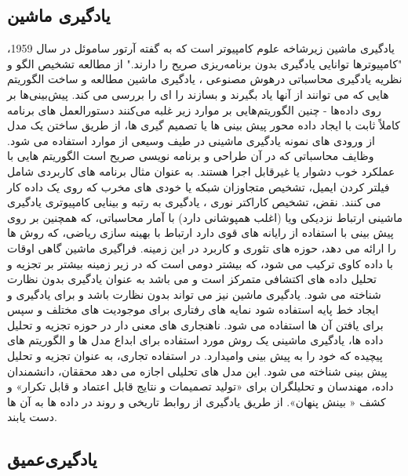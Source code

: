 \subsection{یادگیری‌ ماشین}
یادگیری ماشین زیرشاخه علوم کامپیوتر است که
به گفته آرتور ساموئل در سال 1959، "کامپیوترها
توانایی یادگیری بدون برنامه‌ریزی صریح را دارند."
از مطالعه تشخیص الگو و
نظریه یادگیری محاسباتی درهوش مصنوعی
، یادگیری ماشین مطالعه‌ و
ساخت الگوریتم هایی که می توانند از آنها یاد بگیرند و بسازند را ای را بررسی می کند. 
پیش‌بینی‌ها بر روی داده‌ها  - چنین الگوریتم‌هایی بر موارد زیر غلبه می‌کنند
دستورالعمل های برنامه کاملاً ثابت با ایجاد داده محور
پیش بینی ها یا تصمیم گیری ها، از طریق ساختن یک مدل از
ورودی های نمونه یادگیری ماشینی در طیف وسیعی از موارد استفاده می شود. 
وظایف محاسباتی که در آن طراحی و برنامه نویسی صریح است
الگوریتم هایی با عملکرد خوب دشوار یا غیرقابل اجرا هستند.
به عنوان مثال برنامه های کاربردی شامل فیلتر کردن ایمیل، تشخیص
متجاوزان شبکه یا خودی های مخرب که روی یک داده کار می کنند. 
نقض،  تشخیص کاراکتر نوری ،  یادگیری به
رتبه و بینایی کامپیوتری
یادگیری ماشینی ارتباط نزدیکی ویا (اغلب همپوشانی دارد)  با آمار محاسباتی، که همچنین بر روی
پیش بینی با استفاده از رایانه های قوی دارد
 ارتباط با بهینه سازی ریاضی، که روش ها را ارائه می دهد،
حوزه های تئوری و کاربرد در این زمینه. فراگیری ماشین
گاهی اوقات با داده کاوی ترکیب می شود،  که بیشتر دومی است
که در زیر زمینه بیشتر بر تجزیه و تحلیل داده های اکتشافی متمرکز است و می باشد
به عنوان یادگیری بدون نظارت شناخته می شود. یادگیری ماشین نیز می تواند
بدون نظارت  باشد و برای یادگیری و ایجاد خط پایه استفاده شود
نمایه های رفتاری برای موجودیت های مختلف و سپس برای یافتن آن ها  استفاده می شود. 
ناهنجاری های معنی دار
در حوزه تجزیه و تحلیل داده ها، یادگیری ماشینی یک
روش مورد استفاده برای ابداع مدل ها و الگوریتم های پیچیده که
خود را به پیش بینی وا‌میدارد.  در استفاده تجاری،
به عنوان تجزیه و تحلیل پیش بینی شناخته می شود. این مدل های تحلیلی اجازه می دهد
محققان، دانشمندان داده، مهندسان و تحلیلگران برای «تولید
تصمیمات و نتایج قابل اعتماد و قابل تکرار» و کشف « بینش پنهان».
 از طریق یادگیری از روابط تاریخی و
روند در داده ها به آن ها دست یابند.


\subsection{یادگیری‌عمیق
}

